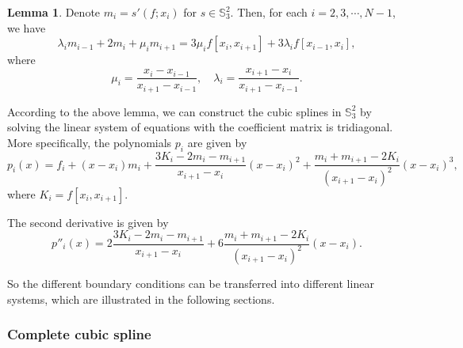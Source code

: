 \documentclass[a4paper]{article}
\theoremstyle{definition}
\newtheorem{lemma}{Lemma}
\begin{document}
\begin{lemma}
  Denote $m_i = s'(f; x_i)$ for $s \in \mathbb{S}_3^2$. Then, for each $i = 2, 3, \cdots, N - 1$, we have 
  \begin{equation}
    \lambda_i m_{i - 1} + 2m_i + \mu_i m_{i + 1} = 3\mu_i f[x_i, x_{i + 1}] + 3\lambda_i f[x_{i - 1}, x_i],
    \label{eq:pp-form-spline-tridiagonal}
  \end{equation}
  where 
  \begin{equation}
    \mu_i = \frac{x_i - x_{i - 1}}{x_{i + 1} - x_{i - 1}}, \quad \lambda_i = \frac{x_{i + 1} - x_i}{x_{i + 1} - x_{i - 1}}.
    \label{eq:pp-form-spline-coefficients}
  \end{equation}
\end{lemma}

According to the above lemma, we can construct the cubic splines in $\mathbb{S}_3^2$ by solving the linear system of equations with the coefficient matrix is tridiagonal. 
More specifically, the polynomials $p_i$ are given by 
\begin{equation}
  p_i(x) = f_i + (x - x_i)m_i + \frac{3K_i - 2m_i - m_{i + 1}}{x_{i + 1} - x_i} (x - x_i)^2 + \frac{m_i + m_{i + 1} - 2K_i}{(x_{i + 1} - x_i)^2} (x - x_i)^3,
  \label{eq:pp-form-spline-polynomial}
\end{equation}
where $K_i = f[x_i, x_{i + 1}]$.

The second derivative is given by 
\begin{equation}
  p''_{i}(x) = 2\frac{3K_i - 2m_i - m_{i + 1}}{x_{i + 1} - x_i} + 6\frac{m_i + m_{i + 1} - 2K_i}{(x_{i + 1} - x_i)^2}(x - x_i).
  \label{eq:pp-form-spline-second-derivative}
\end{equation}

So the different boundary conditions can be transferred into different linear systems, which are illustrated in the following sections.

\subsubsection{Complete cubic spline}
\end{document}
